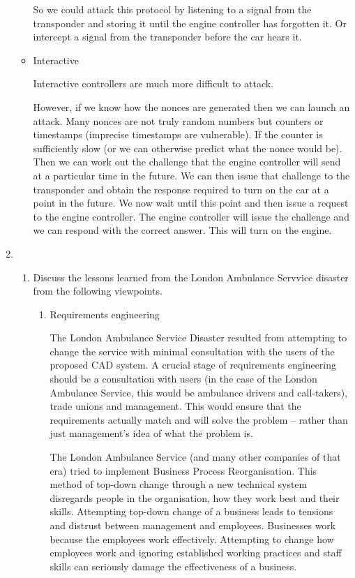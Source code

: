 \documentclass[10pt,\jkfside,a4paper]{article}
\begin{document}
\begin{enumerate}
\begin{itemize}
So we could attack this protocol by listening to a signal from the transponder and storing it 
until the engine controller has forgotten it. Or intercept a signal from the transponder before 
the car hears it.

\item Interactive

Interactive controllers are much more difficult to attack.

However, if we know how the nonces are generated then we can launch an attack. Many 
nonces are not truly random numbers but counters or timestamps (imprecise timestamps are 
vulnerable). If the counter is 
sufficiently slow (or we can otherwise predict what the nonce would be). Then we can 
work out the challenge that the engine controller will send at a particular time in the 
future. We can then issue that challenge to the transponder and 
obtain the response required to turn on the car at a point in the future. We now 
wait until this point and then issue a request to the engine controller. The engine 
controller will issue the challenge and we can respond with the correct answer. This 
will turn on the engine.

\end{itemize}

\item 

\begin{enumerate}

\item Discuss the lessons learned from the London Ambulance Servvice disaster from the following viewpoints.

\begin{enumerate}[label=(\roman*)]

\item Requirements engineering

The London Ambulance Service Disaster resulted from attempting to change the service with 
minimal consultation with the users of the proposed CAD system. A crucial stage of requirements engineering should be 
a consultation with users (in the case of the London Ambulance Service, this would be ambulance drivers and 
call-takers), trade unions and management. This would ensure that the requirements actually match and will solve 
the problem -- rather than just management's idea of what the problem is. 

The London Ambulance Service (and many other companies of that era) tried to implement 
Business Process Reorganisation. This method of top-down change through a new technical system 
disregards people in the organisation, how they work best and their skills. Attempting top-down 
change of a business leads to tensions and distrust between management and employees. Businesses work 
because the employees work effectively. Attempting to change how employees work and ignoring 
established working practices and staff skills can seriously damage the effectiveness of a business.


\end{enumerate}
\end{enumerate}
\end{enumerate}
\end{document}
